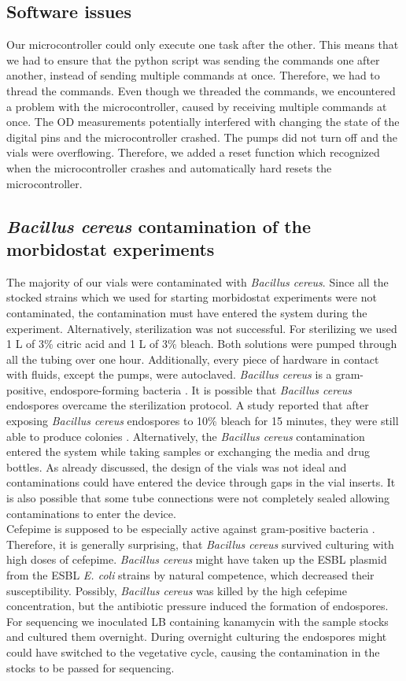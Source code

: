 \subsection{Software issues}
Our microcontroller could only execute one task after the other. This means that we had to ensure that the python script was sending the commands one after another, instead of sending multiple commands at once. Therefore, we had to thread the commands.  Even though we threaded the commands, we encountered a problem with the microcontroller, caused by receiving multiple commands at once. The OD measurements potentially interfered with changing the state of the digital pins and the microcontroller crashed. The pumps did not turn off and the vials were overflowing. Therefore, we added a reset function which recognized when the microcontroller crashes and automatically hard resets the microcontroller.   

\subsection{\textit{Bacillus cereus} contamination of the morbidostat experiments}
The majority of our vials were contaminated with \textit{Bacillus cereus}. Since all the stocked strains which we used for starting morbidostat experiments were not contaminated, the contamination must have entered the system during the experiment. Alternatively, sterilization was not successful. For sterilizing we used 1 L of 3\% citric acid and 1 L of 3\% bleach. Both solutions were pumped through all the tubing over one hour. Additionally, every piece of hardware in contact with fluids, except the pumps, were autoclaved. \textit{Bacillus cereus} is a gram-positive, endospore-forming bacteria \cite{bintsis_foodborne_2017}. It is possible that \textit{Bacillus cereus} endospores overcame the sterilization protocol. A study reported that after exposing \textit{Bacillus cereus} endospores to 10\% bleach for 15 minutes, they were still able to produce colonies \cite{robertson_effect_2018}. Alternatively, the \textit{Bacillus cereus} contamination entered the system while taking samples or exchanging the media and drug bottles. As already discussed, the design of the vials was not ideal and contaminations could have entered the device through gaps in the vial inserts. It is also possible that some tube connections were not completely sealed allowing contaminations to enter the device.  \\
Cefepime is supposed to be especially active against gram-positive bacteria \cite{sykes_chapter_2014}. Therefore, it is generally surprising, that \textit{Bacillus cereus} survived culturing with high doses of cefepime. \textit{Bacillus cereus} might have taken up the ESBL plasmid from the ESBL \textit{E. coli} strains by natural competence, which decreased their susceptibility. Possibly, \textit{Bacillus cereus} was killed by the high cefepime concentration, but the antibiotic pressure induced the formation of endospores. For sequencing we inoculated LB containing kanamycin with the sample stocks and cultured them overnight. During overnight culturing the endospores might could have switched to the vegetative cycle, causing the contamination in the stocks to be passed for sequencing.

